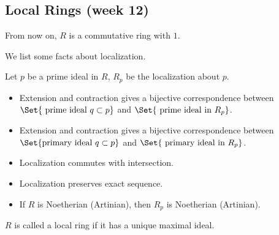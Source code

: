 \subsection{Local Rings (week 12)}

From now on, $R$ is a commutative ring with $1$.

We list some facts about localization.
\begin{prop} \label{prop:property-of-localization}
  Let $p$ be a prime ideal in $R$, $R_p$ be the localization about $p$.
  \begin{itemize}
    \item Extension and contraction gives a bijective correspondence between
      $\Set{ \text{ prime ideal } q \subset p }$ and $\Set{ \text{ prime ideal in } R_p}$.
    \item Extension and contraction gives a bijective correspondence between
      $\Set{ \text{primary ideal } q \subset p }$ and $\Set{ \text{ primary ideal in } R_p}$.
    \item Localization commutes with intersection.
    \item Localization preserves exact sequence.
    \item If $R$ is Noetherian (Artinian), then $R_p$ is Noetherian (Artinian).
  \end{itemize}
\end{prop}

\begin{definition}
  $R$ is called a local ring if it has a unique maximal ideal.
\end{definition}

